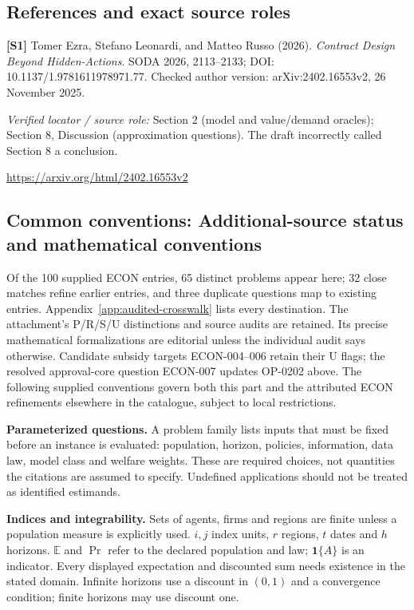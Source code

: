\documentclass[11pt,a4paper]{article}
\begin{document}
\subsection*{References and exact source roles}

{\footnotesize\raggedright
\par\noindent\textbf{[S1]} Tomer Ezra, Stefano Leonardi, and Matteo Russo (2026). \emph{Contract Design Beyond Hidden-Actions}. SODA 2026, 2113--2133; DOI: 10.1137/1.9781611978971.77. Checked author version: arXiv:2402.16553v2, 26 November 2025.\par \textit{Verified locator / source role:} Section 2 (model and value/demand oracles); Section 8, Discussion (approximation questions). The draft incorrectly called Section 8 a conclusion.\par \url{https://arxiv.org/html/2402.16553v2}\par\smallskip
}

\subsection*{Common conventions: Additional-source status and mathematical conventions}

\label{audited:conventions}

Of the 100 supplied ECON entries, 65 distinct problems appear here; 32 close
matches refine earlier entries, and three duplicate questions map to existing
entries. Appendix~\ref{app:audited-crosswalk} lists every destination.
The attachment's P/R/S/U distinctions and source audits are retained. Its
precise mathematical formalizations are editorial unless the individual audit
says otherwise. Candidate subsidy targets ECON-004--006 retain their U flags;
the resolved approval-core question ECON-007 updates OP-0202 above.
The following supplied conventions govern both this part and the attributed
ECON refinements elsewhere in the catalogue, subject to local restrictions.

\textbf{Parameterized questions.} A problem family lists inputs that must be fixed before an instance is evaluated: population, horizon, policies, information, data law, model class and welfare weights. These are required choices, not quantities the citations are assumed to specify. Undefined applications should not be treated as identified estimands.

\textbf{Indices and integrability.} Sets of agents, firms and regions are finite unless a population measure is explicitly used. \(i,j\) index units, \(r\) regions, \(t\) dates and \(h\) horizons. \(\mathbb E\) and \(\Pr\) refer to the declared population and law; \(\mathbf1\{A\}\) is an indicator. Every displayed expectation and discounted sum needs existence in the stated domain. Infinite horizons use a discount in \((0,1)\) and a convergence condition; finite horizons may use discount one.
\end{document}
